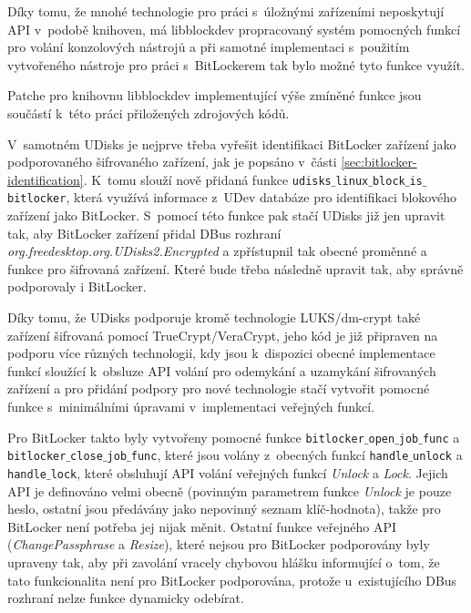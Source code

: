 Díky tomu, že mnohé technologie pro práci s~úložnými zařízeními neposkytují API v~podobě knihoven, má libblockdev propracovaný systém pomocných funkcí pro volání konzolových nástrojů a při samotné implementaci s~použitím vytvořeného nástroje pro práci s~BitLockerem tak bylo možné tyto funkce využít.

Patche pro knihovnu libblockdev implementující výše zmíněné funkce jsou součástí k~této práci přiložených zdrojových kódů.

\label{sec:udisks-implementation}

V~samotném UDisks je nejprve třeba vyřešit identifikaci BitLocker zařízení jako podporovaného šifrovaného zařízení, jak je popsáno v~části \ref{sec:bitlocker-identification}. K~tomu slouží nově přidaná funkce \texttt{udisks$\_$linux$\_$block$\_$is$\_$bitlocker}, která využívá informace z~UDev databáze pro identifikaci blokového zařízení jako BitLocker. S~pomocí této funkce pak stačí UDisks již jen upravit tak, aby BitLocker zařízení přidal DBus rozhraní \emph{org.freedesktop.org.UDisks2.Encrypted} a zpřístupnil tak obecné proměnné a funkce pro šifrovaná zařízení. Které bude třeba následně upravit tak, aby správně podporovaly i BitLocker.

Díky tomu, že UDisks podporuje kromě technologie LUKS/dm-crypt také zařízení šifrovaná pomocí TrueCrypt/VeraCrypt, jeho kód je již připraven na podporu více různých technologií, kdy jsou k~dispozici obecné implementace funkcí sloužící k~obsluze API volání pro odemykání a uzamykání šifrovaných zařízení a pro přidání podpory pro nové technologie stačí vytvořit pomocné funkce s~minimálními úpravami v~implementaci veřejných funkcí.

Pro BitLocker takto byly vytvořeny pomocné funkce \texttt{bitlocker$\_$open$\_$job$\_$func} a \texttt{bitlocker$\_$close$\_$job$\_$func}, které jsou volány z~obecných funkcí \texttt{handle$\_$unlock} a \texttt{handle$\_$lock}, které obsluhují API volání veřejných funkcí \emph{Unlock} a \emph{Lock}. Jejich API je definováno velmi obecně (povinným parametrem funkce \emph{Unlock} je pouze heslo, ostatní jsou předávány jako nepovinný seznam klíč-hodnota\cite{Storaged2019}), takže pro BitLocker není potřeba jej nijak měnit. Ostatní funkce veřejného API (\emph{ChangePassphrase} a \emph{Resize}), které nejsou pro BitLocker podporovány byly upraveny tak, aby při zavolání vracely chybovou hlášku informující o~tom, že tato funkcionalita není pro BitLocker podporována, protože u~existujícího DBus rozhraní nelze funkce dynamicky odebírat.

